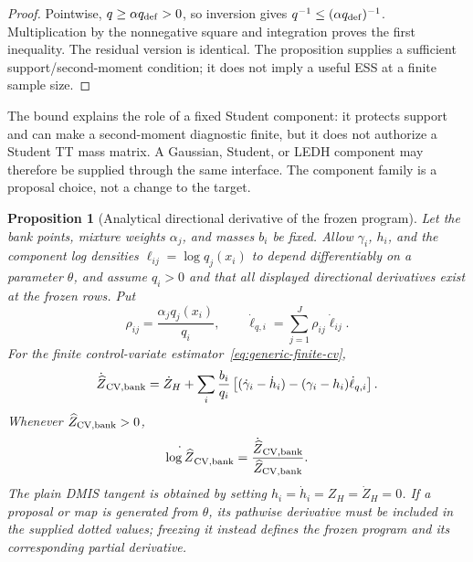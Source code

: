 \documentclass[11pt]{article}
\newtheorem{proposition}{Proposition}
\begin{document}
\begin{proof}
Pointwise, $q\geq\alpha q_{\rm def}>0$, so inversion gives
$q^{-1}\leq(\alpha q_{\rm def})^{-1}$. Multiplication by the nonnegative
square and integration proves the first inequality. The residual version is
identical. The proposition supplies a sufficient support/second-moment
condition; it does not imply a useful ESS at a finite sample size.
\end{proof}

The bound explains the role of a fixed Student component: it protects support
and can make a second-moment diagnostic finite, but it does not authorize a
Student TT mass matrix. A Gaussian, Student, or LEDH component may therefore
be supplied through the same interface. The component family is a proposal
choice, not a change to the target.

\begin{proposition}[Analytical directional derivative of the frozen program]
\label{prop:generic-frozen-tangent}
Let the bank points, mixture weights $\alpha_j$, and masses $b_i$ be fixed.
Allow $\gamma_i$, $h_i$, and the
component log densities $\ell_{ij}=\log q_j(x_i)$ to depend differentiably on
a parameter $\theta$, and assume $q_i>0$ and that all displayed directional
derivatives exist at the frozen rows. Put
\begin{equation}\label{eq:generic-mixture-responsibility}
  \rho_{ij}=\frac{\alpha_jq_j(x_i)}{q_i},
  \qquad
  \dot\ell_{q,i}=\sum_{j=1}^J\rho_{ij}\dot\ell_{ij}.
\end{equation}
For the finite control-variate estimator~\eqref{eq:generic-finite-cv},
\begin{equation}\label{eq:generic-cv-tangent}
  \dot{\widehat Z}_{\rm CV,bank}
  =\dot Z_H+\sum_i\frac{b_i}{q_i}
    \left[(\dot\gamma_i-\dot h_i)
          -(\gamma_i-h_i)\dot\ell_{q,i}\right].
\end{equation}
Whenever $\widehat Z_{\rm CV,bank}>0$,
\begin{equation}\label{eq:generic-log-cv-tangent}
  \dot{\log\widehat Z}_{\rm CV,bank}
  =\frac{\dot{\widehat Z}_{\rm CV,bank}}
         {\widehat Z_{\rm CV,bank}}.
\end{equation}
The plain DMIS tangent is obtained by setting $h_i=\dot h_i=Z_H=\dot Z_H=0$.
If a proposal or map is generated from $\theta$, its pathwise derivative must
be included in the supplied dotted values; freezing it instead defines the
frozen program and its corresponding partial derivative.
\end{proposition}
\end{document}
